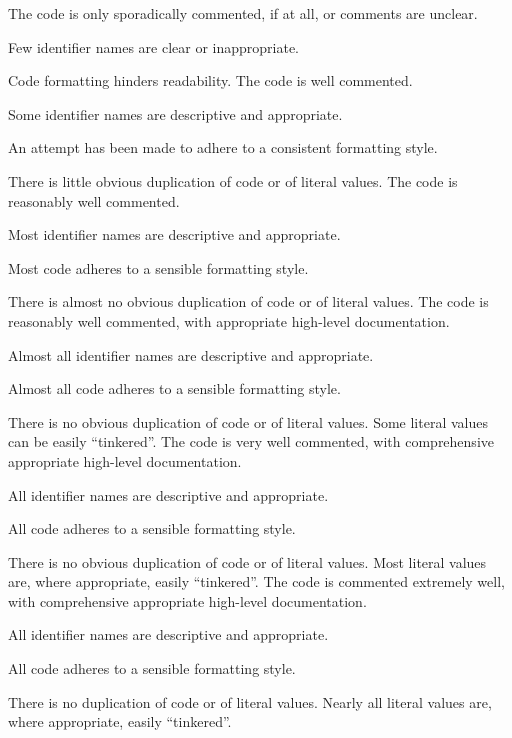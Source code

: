 \documentclass{../../../fal_assignment}
\begin{document}
\begin{markingrubric}
        \grade \fail The code is only sporadically commented, if at all, or comments are unclear.
            \par Few identifier names are clear or inappropriate.
            \par Code formatting hinders readability.
        \grade The code is well commented.
            \par Some identifier names are descriptive and appropriate.
            \par An attempt has been made to adhere to a consistent formatting style.
             \par There is little obvious duplication of code or of literal values.           
        \grade The code is reasonably well commented.
            \par Most identifier names are descriptive and appropriate.
            \par Most code adheres to a sensible formatting style.
             \par There is almost no obvious duplication of code or of literal values.   
        \grade The code is reasonably well commented, with appropriate high-level documentation.
            \par Almost all identifier names are descriptive and appropriate.
            \par Almost all code adheres to a sensible formatting style.
             \par There is no obvious duplication of code or of literal values. Some literal values can be easily ``tinkered''. 
        \grade The code is very well commented, with comprehensive appropriate high-level documentation.
            \par All identifier names are descriptive and appropriate.
            \par All code adheres to a sensible formatting style.
             \par There is no obvious duplication of code or of literal values. Most literal values are, where appropriate, easily ``tinkered''.  
        \grade The code is commented extremely well, with comprehensive appropriate high-level documentation.
            \par All identifier names are descriptive and appropriate.
            \par All code adheres to a sensible formatting style.
            \par There is no duplication of code or of literal values. Nearly all literal values are, where appropriate, easily ``tinkered''.  
\end{markingrubric}
\end{document}
